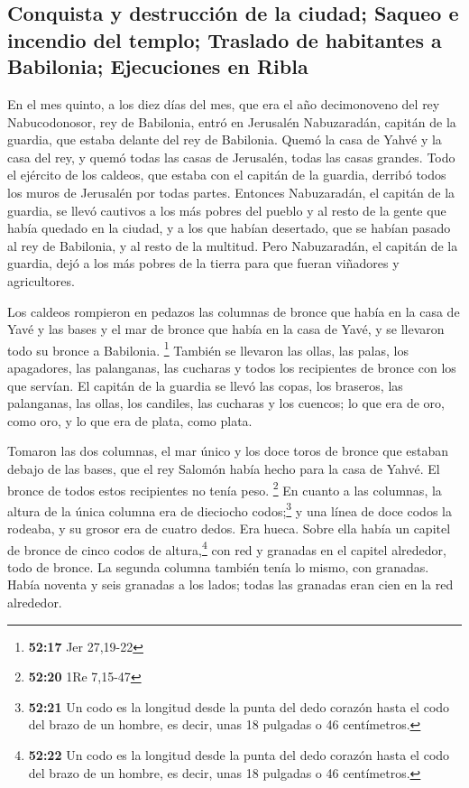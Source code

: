 \hypertarget{conquista-y-destrucciuxf3n-de-la-ciudad-saqueo-e-incendio-del-templo-traslado-de-habitantes-a-babilonia-ejecuciones-en-ribla}{%
\subsection{Conquista y destrucción de la ciudad; Saqueo e incendio del
templo; Traslado de habitantes a Babilonia; Ejecuciones en
Ribla}\label{conquista-y-destrucciuxf3n-de-la-ciudad-saqueo-e-incendio-del-templo-traslado-de-habitantes-a-babilonia-ejecuciones-en-ribla}}

 En el mes quinto, a los diez días del mes, que era el
año decimonoveno del rey Nabucodonosor, rey de Babilonia, entró en
Jerusalén Nabuzaradán, capitán de la guardia, que estaba delante del rey
de Babilonia.  Quemó la casa de Yahvé y la casa del rey,
y quemó todas las casas de Jerusalén, todas las casas grandes.
 Todo el ejército de los caldeos, que estaba con el
capitán de la guardia, derribó todos los muros de Jerusalén por todas
partes.  Entonces Nabuzaradán, el capitán de la guardia,
se llevó cautivos a los más pobres del pueblo y al resto de la gente que
había quedado en la ciudad, y a los que habían desertado, que se habían
pasado al rey de Babilonia, y al resto de la multitud. 
Pero Nabuzaradán, el capitán de la guardia, dejó a los más pobres de la
tierra para que fueran viñadores y agricultores.

 Los caldeos rompieron en pedazos las columnas de bronce
que había en la casa de Yavé y las bases y el mar de bronce que había en
la casa de Yavé, y se llevaron todo su bronce a Babilonia. \footnote{\textbf{52:17}
  Jer 27,19-22}  También se llevaron las ollas, las
palas, los apagadores, las palanganas, las cucharas y todos los
recipientes de bronce con los que servían.  El capitán de
la guardia se llevó las copas, los braseros, las palanganas, las ollas,
los candiles, las cucharas y los cuencos; lo que era de oro, como oro, y
lo que era de plata, como plata.

 Tomaron las dos columnas, el mar único y los doce toros
de bronce que estaban debajo de las bases, que el rey Salomón había
hecho para la casa de Yahvé. El bronce de todos estos recipientes no
tenía peso. \footnote{\textbf{52:20} 1Re 7,15-47}  En
cuanto a las columnas, la altura de la única columna era de dieciocho
codos;\footnote{\textbf{52:21} Un codo es la longitud desde la punta del
  dedo corazón hasta el codo del brazo de un hombre, es decir, unas 18
  pulgadas o 46 centímetros.} y una línea de doce codos la rodeaba, y su
grosor era de cuatro dedos. Era hueca.  Sobre ella había
un capitel de bronce de cinco codos de altura,\footnote{\textbf{52:22}
  Un codo es la longitud desde la punta del dedo corazón hasta el codo
  del brazo de un hombre, es decir, unas 18 pulgadas o 46 centímetros.}
con red y granadas en el capitel alrededor, todo de bronce. La segunda
columna también tenía lo mismo, con granadas.  Había
noventa y seis granadas a los lados; todas las granadas eran cien en la
red alrededor.

